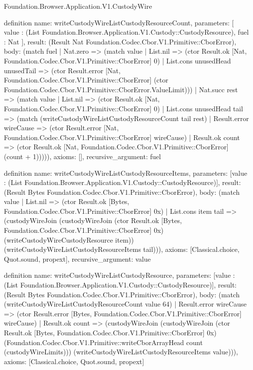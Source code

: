 \begin{lexlean}{Foundation.Browser.Application.V1.CustodyWire}
\begin{semanticmodule}
definition{
  name: writeCustodyWireListCustodyResourceCount,
  parameters: [
    value : (List Foundation.Browser.Application.V1.Custody::CustodyResource),
    fuel : Nat
  ],
  result: (Result Nat Foundation.Codec.Cbor.V1.Primitive::CborError),
  body: (match fuel
    | Nat.zero => (match value
      | List.nil => (ctor Result.ok [Nat, Foundation.Codec.Cbor.V1.Primitive::CborError] 0)
      | List.cons unusedHead unusedTail => (ctor Result.error [Nat, Foundation.Codec.Cbor.V1.Primitive::CborError] (ctor Foundation.Codec.Cbor.V1.Primitive::CborError.ValueLimit)))
    | Nat.succ rest => (match value
      | List.nil => (ctor Result.ok [Nat, Foundation.Codec.Cbor.V1.Primitive::CborError] 0)
      | List.cons unusedHead tail => (match (writeCustodyWireListCustodyResourceCount tail rest)
        | Result.error wireCause => (ctor Result.error [Nat, Foundation.Codec.Cbor.V1.Primitive::CborError] wireCause)
        | Result.ok count => (ctor Result.ok [Nat, Foundation.Codec.Cbor.V1.Primitive::CborError] (count + 1))))),
  axioms: [],
  recursive_argument: fuel
}

definition{
  name: writeCustodyWireListCustodyResourceItems,
  parameters: [value : (List Foundation.Browser.Application.V1.Custody::CustodyResource)],
  result: (Result Bytes Foundation.Codec.Cbor.V1.Primitive::CborError),
  body: (match value
    | List.nil => (ctor Result.ok [Bytes, Foundation.Codec.Cbor.V1.Primitive::CborError] 0x)
    | List.cons item tail => (custodyWireJoin (custodyWireJoin (ctor Result.ok [Bytes, Foundation.Codec.Cbor.V1.Primitive::CborError] 0x) (writeCustodyWireCustodyResource item)) (writeCustodyWireListCustodyResourceItems tail))),
  axioms: [Classical.choice, Quot.sound, propext],
  recursive_argument: value
}

definition{
  name: writeCustodyWireListCustodyResource,
  parameters: [value : (List Foundation.Browser.Application.V1.Custody::CustodyResource)],
  result: (Result Bytes Foundation.Codec.Cbor.V1.Primitive::CborError),
  body: (match (writeCustodyWireListCustodyResourceCount value 64)
    | Result.error wireCause => (ctor Result.error [Bytes, Foundation.Codec.Cbor.V1.Primitive::CborError] wireCause)
    | Result.ok count => (custodyWireJoin (custodyWireJoin (ctor Result.ok [Bytes, Foundation.Codec.Cbor.V1.Primitive::CborError] 0x) (Foundation.Codec.Cbor.V1.Primitive::writeCborArrayHead count (custodyWireLimits))) (writeCustodyWireListCustodyResourceItems value))),
  axioms: [Classical.choice, Quot.sound, propext]
}


\end{semanticmodule}
\end{lexlean}
